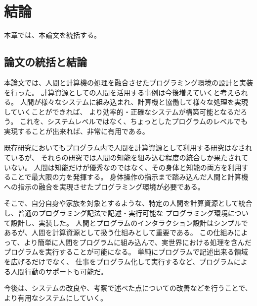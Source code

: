 \chapter{結論}\label{chap:conclusion}

本章では、本論文を統括する。

\newpage

\section{論文の統括と結論}\label{ux8ad6ux6587ux306eux7d71ux62ecux3068ux7d50ux8ad6}

本論文では、人間と計算機の処理を融合させたプログラミング環境の設計と実装を行った。
計算資源としての人間を活用する事例は今後増えていくと考えられる。
人間が様々なシステムに組み込まれ、計算機と協働して様々な処理を実現していくことができれば、
より効率的・正確なシステムが構築可能となるだろう。
これを、システムレベルではなく、ちょっとしたプログラムのレベルでも実現することが出来れば、非常に有用である。

既存研究においてもプログラム内で人間を計算資源として利用する研究はなされているが、
それらの研究では人間の知能を組み込む程度の統合しか果たされていない。
人間は知能だけが優秀なのではなく、その身体と知能の両方を利用することで最大限の力を発揮する。
身体操作の指示まで踏み込んだ人間と計算機への指示の融合を実現させたプログラミング環境が必要である。

そこで、自分自身や家族を対象とするような、特定の人間を計算資源として統合し、普通のプログラミング記法で記述・実行可能な
プログラミング環境について設計し、実装した。
人間とプログラムのインタラクション設計はシンプルであるが、人間を計算資源として扱う仕組みとして重要である。
この仕組みによって、より簡単に人間をプログラムに組み込んで、実世界における処理を含んだプログラムを実行することが可能になる。
単純にプログラムで記述出来る領域を広げるだけでなく、
仕事をプログラム化して実行するなど、プログラムによる人間行動のサポートも可能だ。

今後は、システムの改良や、考察で述べた点についての改善などを行うことで、
より有用なシステムにしていく。
